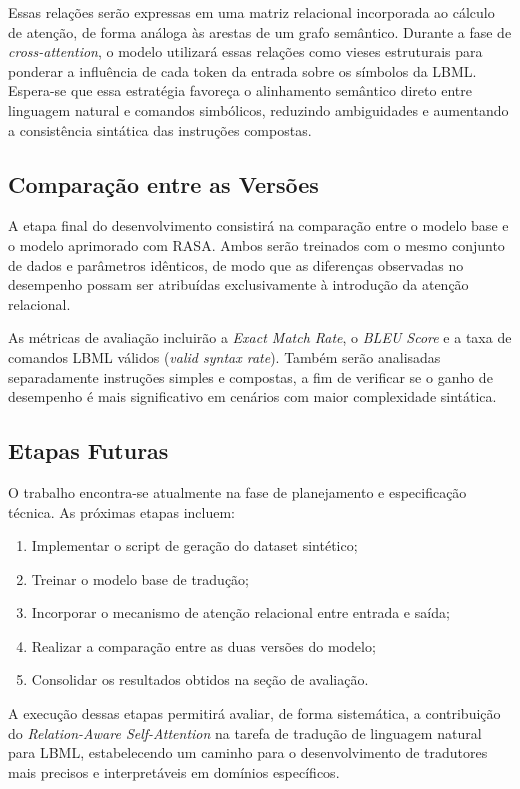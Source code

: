 \documentclass[12pt]{article}
\begin{document}
Essas relações serão expressas em uma matriz relacional incorporada ao cálculo de atenção, de forma análoga às arestas de um grafo semântico. Durante a fase de \textit{cross-attention}, o modelo utilizará essas relações como vieses estruturais para ponderar a influência de cada token da entrada sobre os símbolos da LBML. Espera-se que essa estratégia favoreça o alinhamento semântico direto entre linguagem natural e comandos simbólicos, reduzindo ambiguidades e aumentando a consistência sintática das instruções compostas.

\subsection{Comparação entre as Versões}

A etapa final do desenvolvimento consistirá na comparação entre o modelo base e o modelo aprimorado com RASA. Ambos serão treinados com o mesmo conjunto de dados e parâmetros idênticos, de modo que as diferenças observadas no desempenho possam ser atribuídas exclusivamente à introdução da atenção relacional.

As métricas de avaliação incluirão a \textit{Exact Match Rate}, o \textit{BLEU Score} e a taxa de comandos LBML válidos (\textit{valid syntax rate}). Também serão analisadas separadamente instruções simples e compostas, a fim de verificar se o ganho de desempenho é mais significativo em cenários com maior complexidade sintática.

\subsection{Etapas Futuras}

O trabalho encontra-se atualmente na fase de planejamento e especificação técnica. As próximas etapas incluem:
\begin{enumerate}
  \item Implementar o script de geração do dataset sintético;
  \item Treinar o modelo base de tradução;
  \item Incorporar o mecanismo de atenção relacional entre entrada e saída;
  \item Realizar a comparação entre as duas versões do modelo;
  \item Consolidar os resultados obtidos na seção de avaliação.
\end{enumerate}

A execução dessas etapas permitirá avaliar, de forma sistemática, a contribuição do \textit{Relation-Aware Self-Attention} na tarefa de tradução de linguagem natural para LBML, estabelecendo um caminho para o desenvolvimento de tradutores mais precisos e interpretáveis em domínios específicos.



\end{document}
